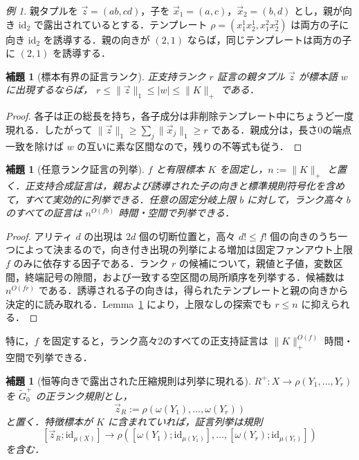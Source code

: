 \documentclass[11pt,a4paper]{ltjsarticle}
\numberwithin{equation}{section}
\theoremstyle{plain}
\newtheorem{lemma}[theorem]{補題}
\theoremstyle{definition}
\theoremstyle{remark}
\newtheorem{example}[theorem]{例}
\newcommand{\tuple}[1]{\vec{#1}}
\begin{document}
\begin{example}
親タプルを \(\tuple z=(ab,cd)\)，子を
\(\tuple x_1=(a,c)\)，\(\tuple x_2=(b,d)\) とし，親が向き \(\mathrm{id}_2\) で露出されているとする．テンプレート
\(\rho=(x_1^1x_2^1,x_1^2x_2^2)\)
は両方の子に向き \(\mathrm{id}_2\) を誘導する．親の向きが \((2,1)\) ならば，同じテンプレートは両方の子に \((2,1)\) を誘導する．
\end{example}

\begin{lemma}[標本有界の証言ランク]
\label{lem:sample-bounded-rank}
正支持ランク \(r\) 証言の親タプル \(\tuple z\) が標本語 \(w\) に出現するならば，
\(r\le\|\tuple z\|_1\le|w|\le\|K\|_+\)
である．
\end{lemma}

\begin{proof}
各子は正の総長を持ち，各子成分は非削除テンプレート中にちょうど一度現れる．したがって
\(\|\tuple z\|_1\ge\sum_j\|\tuple x_j\|_1\ge r\)
である．親成分は，長さ0の端点一致を除けば \(w\) の互いに素な区間なので，残りの不等式も従う．
\end{proof}

\begin{lemma}[任意ランク証言の列挙]
\label{lem:general-witness-enumeration}
\(f\) と有限標本 \(K\) を固定し，\(n:=\|K\|_+\) と置く．正支持合成証言は，親および誘導された子の向きと標準規則符号化を含めて，すべて実効的に列挙できる．任意の固定分岐上限 \(b\) に対して，ランク高々 \(b\) のすべての証言は \(n^{O(fb)}\) 時間・空間で列挙できる．
\end{lemma}

\begin{proof}
アリティ \(d\) の出現は \(2d\) 個の切断位置と，高々 \(d!\le f!\) 個の向きのうち一つによって決まるので，向き付き出現の列挙による増加は固定ファンアウト上限 \(f\) のみに依存する因子である．ランク \(r\) の候補について，親値と子値，変数区間，終端記号の隙間，および一致する空区間の局所順序を列挙する．候補数は \(n^{O(fr)}\) である．誘導される子の向きは，得られたテンプレートと親の向きから決定的に読み取れる．Lemma~\ref{lem:sample-bounded-rank} により，上限なしの探索でも \(r\le n\) に抑えられる．
\end{proof}

特に，\(f\) を固定すると，ランク高々2のすべての正支持証言は \(\|K\|_+^{O(f)}\) 時間・空間で列挙できる．

\begin{lemma}[恒等向きで露出された圧縮規則は列挙に現れる]
\label{lem:exposed-rule-enumerated}
\(R^+:X\to\rho(Y_1,\ldots,Y_r)\) を \(\widetilde G_0^+\) の正ランク規則とし，
\[
  \tuple z_R:=\rho(\omega(Y_1),\ldots,\omega(Y_r))
\]
と置く．特徴標本が \(K\) に含まれていれば，証言列挙は規則
\[
  [\tuple z_R;\mathrm{id}_{\mu(X)}]\to
  \rho([\omega(Y_1);\mathrm{id}_{\mu(Y_1)}],\ldots,
       [\omega(Y_r);\mathrm{id}_{\mu(Y_r)}])
\]
を含む．
\end{lemma}
\end{document}
